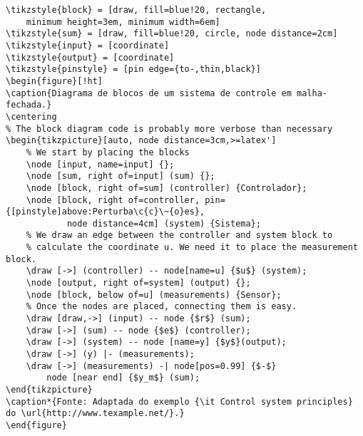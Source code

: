 \begin{verbatim}
\tikzstyle{block} = [draw, fill=blue!20, rectangle, 
    minimum height=3em, minimum width=6em]
\tikzstyle{sum} = [draw, fill=blue!20, circle, node distance=2cm]
\tikzstyle{input} = [coordinate]
\tikzstyle{output} = [coordinate]
\tikzstyle{pinstyle} = [pin edge={to-,thin,black}]
\begin{figure}[!ht]
\caption{Diagrama de blocos de um sistema de controle em malha-fechada.}
\centering
% The block diagram code is probably more verbose than necessary
\begin{tikzpicture}[auto, node distance=3cm,>=latex']
    % We start by placing the blocks
    \node [input, name=input] {};
    \node [sum, right of=input] (sum) {};
    \node [block, right of=sum] (controller) {Controlador};
    \node [block, right of=controller, pin={[pinstyle]above:Perturba\c{c}\~{o}es},
            node distance=4cm] (system) {Sistema};
    % We draw an edge between the controller and system block to 
    % calculate the coordinate u. We need it to place the measurement block. 
    \draw [->] (controller) -- node[name=u] {$u$} (system);
    \node [output, right of=system] (output) {};
    \node [block, below of=u] (measurements) {Sensor};
    % Once the nodes are placed, connecting them is easy. 
    \draw [draw,->] (input) -- node {$r$} (sum);
    \draw [->] (sum) -- node {$e$} (controller);
    \draw [->] (system) -- node [name=y] {$y$}(output);
    \draw [->] (y) |- (measurements);
    \draw [->] (measurements) -| node[pos=0.99] {$-$} 
        node [near end] {$y_m$} (sum);
\end{tikzpicture}
\caption*{Fonte: Adaptada do exemplo {\it Control system principles}  do \url{http://www.texample.net/}.}
\end{figure}
\end{verbatim}
